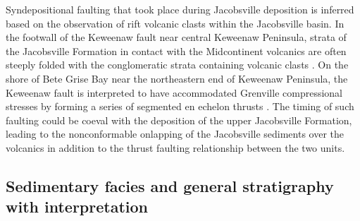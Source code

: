 \documentclass[draft]{agujournal2019}
\begin{document}
Syndepositional faulting that took place during Jacobsville deposition is inferred based on the observation of rift volcanic clasts within the Jacobsville basin. In the footwall of the Keweenaw fault near central Keweenaw Peninsula, strata of the Jacobsville Formation in contact with the Midcontinent volcanics are often steeply folded with the conglomeratic strata containing volcanic clasts \cite{Cannon1993a}. On the shore of Bete Grise Bay near the northeastern end of Keweenaw Peninsula, the Keweenaw fault is interpreted to have accommodated Grenville compressional stresses by forming a series of segmented en echelon thrusts \cite{Tyrrell2019a}. The timing of such faulting could be coeval with the deposition of the upper Jacobsville Formation, leading to the nonconformable onlapping of the Jacobsville sediments over the volcanics in addition to the thrust faulting relationship between the two units.



\subsection{Sedimentary facies and general stratigraphy with interpretation}
\end{document}

